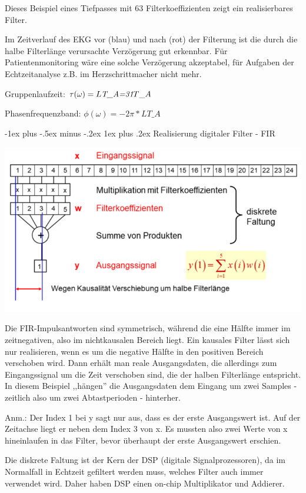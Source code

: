 \documentclass[a4paper]{article}
\makeatletter
\renewcommand{\subsubsection}{\@startsection{subsubsection}{3}{0mm}%
 {-1ex plus -.5ex minus -.2ex}%
 {1ex plus .2ex}%
 {\normalfont\small\bfseries}}
\makeatother
\begin{document}
\begin{multicols}{3}
  \begin{itemize*}
    \item Dieses Beispiel eines Tiefpasses mit 63 Filterkoeffizienten zeigt ein realisierbares Filter.
    \item Im Zeitverlauf des EKG vor (blau) und nach (rot) der Filterung ist die durch die halbe Filterlänge verursachte Verzögerung gut erkennbar. Für Patientenmonitoring wäre eine solche Verzögerung akzeptabel, für Aufgaben der Echtzeitanalyse z.B. im Herzschrittmacher nicht mehr.
    \item Gruppenlaufzeit: $\tau(\omega)=L\emph{T\_A=31}T\_A$
    \item Phasenfrequenzband: $\phi(\omega)=-2\pi*LT\_A$
  \end{itemize*}


  \subsubsection{Realisierung digitaler Filter - FIR}\label{realisierung-digitaler-filter---fir}
  \begin{itemize*}
    \item \includegraphics[width=.5\linewidth]{Assets/Biosignalverarbeitung-fir-realisierung.png}
    \item Die FIR-Impulsantworten sind symmetrisch, während die eine Hälfte immer im zeitnegativen, also im nichtkausalen Bereich liegt. Ein kausales Filter lässt sich nur realisieren, wenn es um die negative Hälfte in den positiven Bereich verschoben wird. Dann erhält man reale Ausgangsdaten, die allerdings zum Eingangssignal um die Zeit verschoben sind, die der halben Filterlänge entspricht. In diesem Beispiel ,,hängen'' die Ausgangsdaten dem Eingang um zwei Samples -zeitlich also um zwei Abtastperioden - hinterher.
    \item Anm.: Der Index 1 bei y sagt nur aus, dass es der erste Ausgangswert ist. Auf der Zeitachse liegt er neben dem Index 3 von x. Es mussten also zwei Werte von x hineinlaufen in das Filter, bevor überhaupt der erste Ausgangswert erschien.
    \item Die diskrete Faltung ist der Kern der DSP (digitale Signalprozessoren), da im Normalfall in Echtzeit gefiltert werden muss, welches Filter auch immer verwendet wird. Daher haben DSP einen on-chip Multiplikator und Addierer.

\end{itemize*}
\end{multicols}
\end{document}
